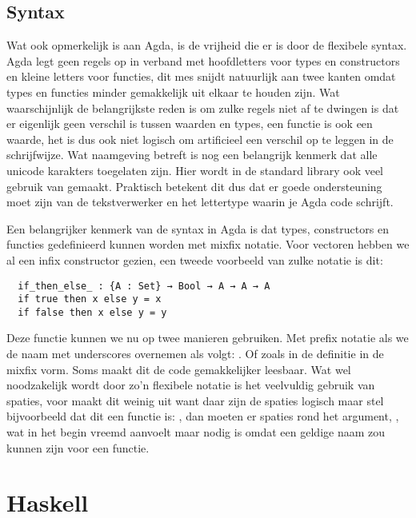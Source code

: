 \subsection{Syntax}

Wat ook opmerkelijk is aan Agda, is de vrijheid die er is door de flexibele
syntax. Agda legt geen regels op in verband met hoofdletters voor types en
constructors en kleine letters voor functies, dit mes snijdt natuurlijk aan
twee kanten omdat types en functies minder gemakkelijk uit elkaar te houden
zijn. Wat waarschijnlijk de belangrijkste reden is om zulke regels niet af te
dwingen is dat er eigenlijk geen verschil is tussen waarden en types, een
functie is ook een waarde, het is dus ook niet logisch om artificieel een
verschil op te leggen in de schrijfwijze. Wat naamgeving betreft is nog een
belangrijk kenmerk dat alle unicode karakters toegelaten zijn. Hier wordt in de
standard library ook veel gebruik van gemaakt. Praktisch betekent dit dus dat
er goede ondersteuning moet zijn van de tekstverwerker en het lettertype waarin
je Agda code schrijft.

Een belangrijker kenmerk van de syntax in Agda is dat types, constructors en
functies gedefinieerd kunnen worden met mixfix notatie. Voor vectoren hebben we
al een infix constructor gezien, een tweede voorbeeld van zulke notatie is dit:

\begin{verbatim}
  if_then_else_ : {A : Set} → Bool → A → A → A
  if true then x else y = x
  if false then x else y = y
\end{verbatim}

Deze functie kunnen we nu op twee manieren gebruiken. Met prefix notatie als we
de naam met underscores overnemen als volgt: . Of
zoals in de definitie in de mixfix vorm. Soms maakt dit de code gemakkelijker
leesbaar. Wat wel noodzakelijk wordt door zo'n flexibele notatie is het
veelvuldig gebruik van spaties, voor  maakt dit weinig uit
want daar zijn de spaties logisch maar stel bijvoorbeeld dat dit een functie
is: \iagda{[_]}, dan moeten er spaties rond het argument, \iagda{[ x ]}, wat in
het begin vreemd aanvoelt maar nodig is omdat \iagda{[x]} een geldige naam zou
kunnen zijn voor een functie.


\section{Haskell}

